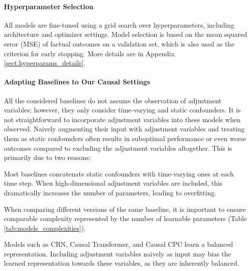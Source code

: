 \documentclass[10pt]{article} %
\begin{document}
\paragraph{Hyperparameter Selection} All models are fine-tuned using a grid search over hyperparameters, including architecture and optimizer settings. Model selection is based on the mean squared error (MSE) of factual outcomes on a validation set, which is also used as the criterion for early stopping. More details are in Appendix \ref{sect:hyperparams_details}.

\paragraph{Adapting Baselines to Our Causal Settings} \label{parag:adapat_baselines} All the considered baselines do not assume the observation of adjustment variables; however, they only consider time-varying and static confounders. It is not straightforward to incorporate adjustment variables into these models when observed. Naively augmenting their input with adjustment variables and treating them as static confounders often results in suboptimal performance or even worse outcomes compared to excluding the adjustment variables altogether. This is primarily due to two reasons: 
\begin{inparaenum}
\item Most baselines concatenate static confounders with time-varying ones at each time step. When high-dimensional adjustment variables are included, this dramatically increases the number of parameters, leading to overfitting. 
\item When comparing different versions of the same baseline, it is important to ensure comparable complexity represented by the number of learnable parameters (Table \ref{tab:models_complexities}).
\item Models such as CRN, Causal Transformer, and Causal CPC learn a balanced representation. Including adjustment variables naively as input may bias the learned representation towards these variables, as they are inherently balanced. 
\end{inparaenum}
\end{document}
